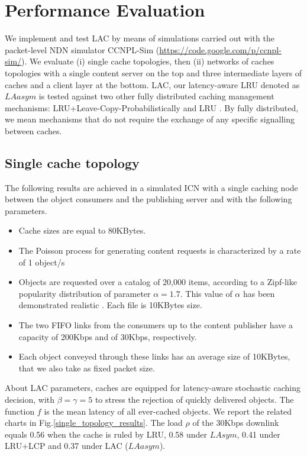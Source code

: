 \documentclass[conference]{IEEEtran}
\begin{document}
\section{Performance Evaluation}
\label{sec:performance_evaluation}

We implement and test LAC by means of simulations carried out with the packet-level NDN simulator CCNPL-Sim (\url{https://code.google.com/p/ccnpl-sim/}). We evaluate (i) single cache topologies, then (ii) networks of caches topologies with a single content server on the top and three intermediate layers of caches and a client layer at the bottom.
LAC, our latency-aware LRU denoted as $LAasym$ is tested against two other fully distributed caching management mechanisms: LRU+Leave-Copy-Probabilistically and LRU \cite{1395054}\cite{643}. By fully distributed, we mean mechanisms that do not require the exchange of any specific signalling between caches.



\subsection{Single cache topology}
The following results are achieved in a simulated ICN with a single caching node between the object consumers and the publishing server and with the following parameters. 
\begin{itemize}
	\item Cache sizes are equal to 80KBytes. 
	\item The Poisson process for generating content requests is characterized by a rate of 1 object/s
	\item Objects are requested over a catalog of 20,000 items, according to a  Zipf-like popularity distribution of
	parameter $\alpha = 1.7$. This value of $\alpha$ has been demonstrated realistic \cite{Mitra:2011:CWV:1961659.1961662}. Each file is 10KBytes size.
	\item The two FIFO links from the consumers up to the content publisher have a capacity of 200Kbps and of 30Kbps, respectively. 
	\item Each object conveyed through these links has an average size of 10KBytes, that we also take as fixed packet size.
\end{itemize}
About LAC parameters, caches are equipped for latency-aware stochastic caching decision, with $\beta = \gamma = 5$ to stress the rejection of quickly delivered objects. The function $f$ is the mean latency of all ever-cached objects.
We report the related charts in Fig.\ref{single_topology_results}.
The load $\rho$ of the 30Kbps downlink equals 0.56 when the cache is ruled by LRU, 0.58 under $LAsym$, 0.41 under LRU+LCP and 0.37 under LAC ($LAasym$).
\end{document}
